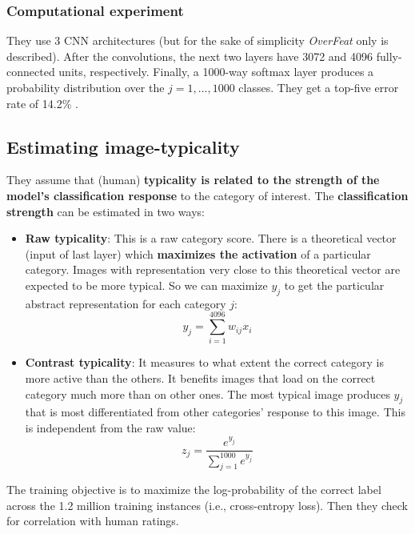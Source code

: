 
\subsubsection{Computational experiment}
They use 3 CNN architectures (but for the sake of simplicity \textit{OverFeat} only is described). After the convolutions, the next two layers have 3072 and 4096 fully-connected units, respectively.
Finally, a 1000-way softmax layer produces a probability distribution over the $j = 1,\dots,1000$ classes. They get a top-five error rate of 14.2\% \notet.


\subsection{Estimating image-typicality}
They assume that (human) \textbf{typicality is related to the strength of the model's classification response} to the category of interest.
The \textbf{classification strength} can be estimated in two ways:
\begin{itemize}
    \item \textbf{Raw typicality}: This is a raw category score. There is a theoretical vector (input of last layer) which \textbf{maximizes the activation} of a particular category. Images with representation very close to this theoretical vector are expected to be more typical. So we can maximize $y_j$ to get the particular abstract representation for each category $j$:
    \[
    y_j = \sum_{i=1}^{4096} w_{ij}x_i
    \]
    \item \textbf{Contrast typicality}: It measures to what extent the correct category is more active than the others. It benefits images that load on the correct category much more than on other ones. The most typical image produces $y_j$ that is most differentiated from other categories' response to this image. This is independent from the raw value:
    \[
    z_j = \frac{e^{y_j}}{ \sum_{j=1}^{1000} e^{y_j} }
    \]
\end{itemize}

The training objective is to maximize the log-probability of the correct label across the 1.2 million training instances (i.e., cross-entropy loss). Then they check for correlation with human ratings.

